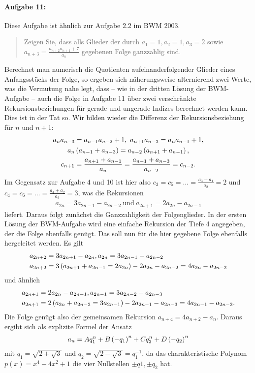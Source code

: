 \documentclass[11pt,a4paper]{article}
\begin{document}
\paragraph{Aufgabe 11:}
Diese Aufgabe ist ähnlich zur Aufgabe 2.2 im BWM 2003. 
\begin{quote}
  Zeigen Sie, dass alls Glieder der durch $a_1=1, a_2=1, a_3=2$ sowie
  $a_{n+3}=\frac{a_{n+2}a_{n+1}+7}{a_n}$ gegebenen Folge ganzzahlig sind.  
\end{quote}
Berechnet man numerisch die Quotienten aufeinanderfolgender Glieder eines
Anfangsstücks der Folge, so ergeben sich näherungsweise alternierend zwei
Werte, was die Vermutung nahe legt, dass -- wie in der dritten Lösung der
BWM-Aufgabe -- auch die Folge in Aufgabe 11 über zwei verschränkte
Rekursionsbeziehungen für gerade und ungerade Indizes berechnet werden kann.
Dies ist in der Tat so. Wir bilden wieder die Differenz der
Rekursionsbeziehung für $n$ und $n+1$:
\begin{gather*}
  a_na_{n-3}=a_{n-1}a_{n-2}+1,\ a_{n+1}a_{n-2}=a_na_{n-1}+1,\\
  a_n\left(a_{n-1}+a_{n-3}\right)=a_{n-2}\left(a_{n+1}+a_{n-1}\right),\\
  c_{n+1}=\frac{a_{n+1}+a_{n-1}}{a_n}=\frac{a_{n-1}+a_{n-3}}{a_{n-2}}=c_{n-2}.
\end{gather*}
Im Gegensatz zur Aufgabe 4 und 10 ist hier also
$c_3=c_5=\dots=\frac{a_3+a_1}{a_2}=2$ und
$c_4=c_6=\dots=\frac{a_4+a_2}{a_3}=3$, was die Rekursionen
\begin{gather*}
  a_{2n}=3a_{2n-1}-a_{2n-2}\ \text{und}\ a_{2n+1}=2a_{2n}-a_{2n-1}
\end{gather*}
liefert.  Daraus folgt zunächst die Ganzzahligkeit der Folgenglieder.  In der
ersten Lösung der BWM-Aufgabe wird eine einfache Rekursion der Tiefe 4
angegeben, der die Folge ebenfalls genügt.  Das soll nun für die hier gegebene
Folge ebenfalls hergeleitet werden.  Es gilt
\begin{align*}
  a_{2n+2}&=3a_{2n+1}-a_{2n}, a_{2n}=3a_{2n-1}-a_{2n-2}\\
  a_{2n+2}&=3\left(a_{2n+1}+a_{2n-1}=2a_{2n}\right)-2a_{2n}-a_{2n-2}=4a_{2n}-a_{2n-2} 
\end{align*}
und ähnlich
\begin{align*}
  a_{2n+1}&=2a_{2n}-a_{2n-1}, a_{2n-1}=3a_{2n-2}-a_{2n-3}\\
  a_{2n+1}&=2\left(a_{2n}+a_{2n-2}=3a_{2n-1}\right)-2a_{2n-1}-a_{2n-3}=4a_{2n-1}-a_{2n-3}.
\end{align*}
Die Folge genügt also der gemeinsamen Rekursion $a_{n+4}=4a_{n+2}-a_n$.
Daraus ergibt sich als explizite Formel der Ansatz 
\begin{gather*}
  a_n=Aq_1^n+B\left(-q_1\right)^n+Cq_2^n+D\left(-q_2\right)^n
\end{gather*}
mit $q_1=\sqrt{2+\sqrt{3}}$ und $q_2=\sqrt{2-\sqrt{3}}=q_1^{-1}$, da das
charakteristische Polynom $p(x)=x^4-4x^2+1$ die vier Nullstellen $\pm q1, \pm
q_2$ hat. 
\end{document}
